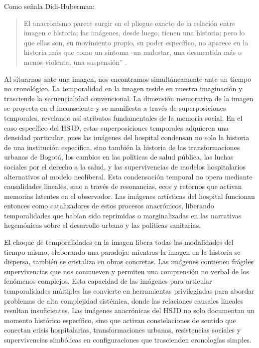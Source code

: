 Como señala Didi-Huberman: 

\begin{quote}
    El anacronismo parece surgir en el pliegue exacto de la relación entre imagen e historia; las imágenes, desde luego, tienen una historia; pero lo que ellas son, su movimiento propio, su poder específico, no aparece en la historia más que como un síntoma -un malestar, una desmentida más o menos violenta, una suspensión'' \parencite[p. 48]{DidiHuberman2011}.
\end{quote}

Al situarnos ante una imagen, nos encontramos simultáneamente ante un tiempo no cronológico. La temporalidad en la imagen reside en nuestra imaginación y trasciende la secuencialidad convencional. La dimensión memorativa de la imagen se proyecta en el inconsciente y se manifiesta a través de superposiciones temporales, revelando así atributos fundamentales de la memoria social. En el caso específico del HSJD, estas superposiciones temporales adquieren una densidad particular, pues las imágenes del hospital condensan no solo la historia de una institución específica, sino también la historia de las transformaciones urbanas de Bogotá, los cambios en las políticas de salud pública, las luchas sociales por el derecho a la salud, y las supervivencias de modelos hospitalarios alternativos al modelo neoliberal. Esta condensación temporal no opera mediante causalidades lineales, sino a través de resonancias, ecos y retornos que activan memorias latentes en el observador. Las imágenes artísticas del hospital funcionan entonces como catalizadores de estos procesos anacrónicos, liberando temporalidades que habían sido reprimidas o marginalizadas en las narrativas hegemónicas sobre el desarrollo urbano y las políticas sanitarias.

El choque de temporalidades en la imagen libera todas las modalidades del tiempo mismo, elaborando una paradoja: mientras la imagen en la historia se dispersa, también se cristaliza en obras concretas. Las imágenes contienen frágiles supervivencias que nos conmueven y permiten una comprensión no verbal de los fenómenos complejos. Esta capacidad de las imágenes para articular temporalidades múltiples las convierte en herramientas privilegiadas para abordar problemas de alta complejidad sistémica, donde las relaciones causales lineales resultan insuficientes. Las imágenes anacrónicas del HSJD no solo documentan un momento histórico específico, sino que activan constelaciones de sentido que conectan crisis hospitalarias, transformaciones urbanas, resistencias sociales y supervivencias simbólicas en configuraciones que trascienden cronologías simples.

